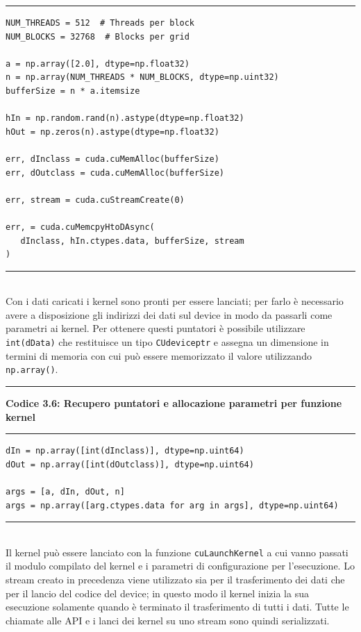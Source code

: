 \documentclass[12pt,a4paper]{report}
\begin{document}
\noindent\rule[0.5ex]{\linewidth}{1pt}
\begin{lstlisting}
NUM_THREADS = 512  # Threads per block
NUM_BLOCKS = 32768  # Blocks per grid

a = np.array([2.0], dtype=np.float32)
n = np.array(NUM_THREADS * NUM_BLOCKS, dtype=np.uint32)
bufferSize = n * a.itemsize

hIn = np.random.rand(n).astype(dtype=np.float32)
hOut = np.zeros(n).astype(dtype=np.float32)

err, dInclass = cuda.cuMemAlloc(bufferSize)
err, dOutclass = cuda.cuMemAlloc(bufferSize)

err, stream = cuda.cuStreamCreate(0)

err, = cuda.cuMemcpyHtoDAsync(
   dInclass, hIn.ctypes.data, bufferSize, stream
)

\end{lstlisting}
\noindent\rule[0.5ex]{\linewidth}{1pt} \\[10pt]
Con i dati caricati i kernel sono pronti per essere lanciati; per farlo è necessario avere a disposizione gli indirizzi dei dati sul device in modo da passarli come parametri ai kernel. Per ottenere questi puntatori è possibile utilizzare \verb|int(dData)| che restituisce un tipo \verb|CUdeviceptr| e assegna un dimensione in termini di memoria con cui può essere memorizzato il valore utilizzando \verb|np.array()|. \newpage

\noindent\rule[0.5ex]{\linewidth}{2pt}
\small{\textbf{Codice 3.6: Recupero puntatori e allocazione parametri per funzione kernel}} \\
\noindent\rule[0.5ex]{\linewidth}{1pt}
\begin{lstlisting}
dIn = np.array([int(dInclass)], dtype=np.uint64)
dOut = np.array([int(dOutclass)], dtype=np.uint64)

args = [a, dIn, dOut, n]
args = np.array([arg.ctypes.data for arg in args], dtype=np.uint64)
\end{lstlisting}
\noindent\rule[0.5ex]{\linewidth}{1pt} \\[10pt]
Il kernel può essere lanciato con la funzione \verb|cuLaunchKernel| a cui vanno passati il modulo compilato del kernel e i parametri di configurazione per l'esecuzione. Lo stream creato in precedenza viene utilizzato sia per il trasferimento dei dati che per il lancio del codice del device; in questo modo il kernel inizia la sua esecuzione solamente quando è terminato il trasferimento di tutti i dati. Tutte le chiamate alle API e i lanci dei kernel su uno stream sono quindi serializzati.\newline
\end{document}
